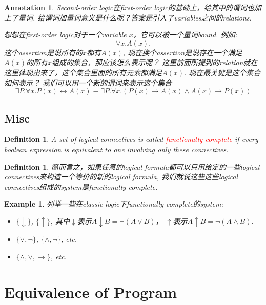 \documentclass{article}
\newtheorem{example}[theorem]{Example}
\newtheorem{definition}[theorem]{Definition}
\newtheorem{annotation}[theorem]{Annotation}
\newcommand{\redt}[1]{\textcolor{red}{#1}}
\begin{document}
\begin{annotation}
\rm Second-order logic在first-order logic的基础上，给其中的谓词也加上了量词. 给谓词加量词意义是什么呢？答案是引入了variables之间的relations. 

想想在first-order logic对于一个variable $x$，它可以被一个量词bound.  例如:
\[
	\forall x. A(x).
\]
这个assertion是说所有的$x$都有$A(x)$, 现在换个assertion是说存在一个满足$A(x)$的所有$x$组成的集合，那应该怎么表示呢？ 这里前面所提到的relation就在这里体现出来了，这个集合里面的所有元素都满足$A(x)$. 现在最关键是这个集合如何表示？ 我们可以用一个新的谓词来表示这个集合
\[
	\exists P. \forall x. P(x) \leftrightarrow A(x) \equiv \exists P. \forall x. (P(x) \to A(x) \wedge A(x) \to P(x))
\]
\end{annotation}

\subsection{Misc}

\begin{definition}
\rm A set of logical connectives is called \redt{functionally complete} if every boolean expression is equivalent to one involving only these connectives.
\end{definition}

\begin{definition}
\rm 简而言之，如果任意的logical formula都可以只用给定的一些logical connectives来构造一个等价的新的logical formula, 我们就说这些这些logical connectives组成的system是functionally complete. 
\end{definition}

\begin{example}
\rm 列举一些在classic logic下functionally complete的system:
\begin{itemize}
	\item $\{\downarrow\}$, $\{\uparrow\}$, 其中$\downarrow$表示$A \downarrow B = \neg (A \vee B)$， $\uparrow$表示$A \uparrow B = \neg (A \wedge B)$.
	\item $\{\vee ,\neg \}$, $\{\wedge ,\neg \}$, etc.
	\item $\{\land ,\lor ,\rightarrow \}$, etc.
\end{itemize}
\end{example}

\newpage
\section{Equivalence of Program}
\end{document}
